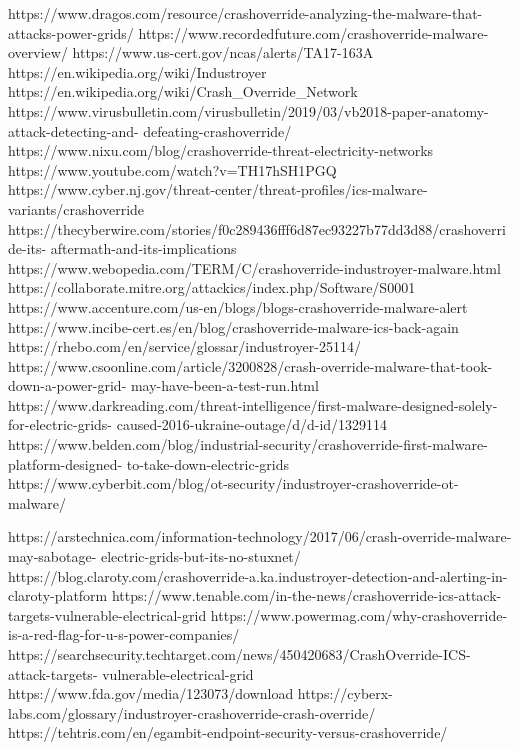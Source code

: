 https://www.dragos.com/resource/crashoverride-analyzing-the-malware-that-attacks-power-grids/
https://www.recordedfuture.com/crashoverride-malware-overview/
https://www.us-cert.gov/ncas/alerts/TA17-163A
https://en.wikipedia.org/wiki/Industroyer
https://en.wikipedia.org/wiki/Crash_Override_Network
https://www.virusbulletin.com/virusbulletin/2019/03/vb2018-paper-anatomy-attack-detecting-and-
defeating-crashoverride/
https://www.nixu.com/blog/crashoverride-threat-electricity-networks
https://www.youtube.com/watch?v=TH17hSH1PGQ
https://www.cyber.nj.gov/threat-center/threat-profiles/ics-malware-variants/crashoverride
https://thecyberwire.com/stories/f0c289436fff6d87ec93227b77dd3d88/crashoverride-its-
aftermath-and-its-implications
https://www.webopedia.com/TERM/C/crashoverride-industroyer-malware.html
https://collaborate.mitre.org/attackics/index.php/Software/S0001
https://www.accenture.com/us-en/blogs/blogs-crashoverride-malware-alert
https://www.incibe-cert.es/en/blog/crashoverride-malware-ics-back-again
https://rhebo.com/en/service/glossar/industroyer-25114/
https://www.csoonline.com/article/3200828/crash-override-malware-that-took-down-a-power-grid-
may-have-been-a-test-run.html
https://www.darkreading.com/threat-intelligence/first-malware-designed-solely-for-electric-grids-
caused-2016-ukraine-outage/d/d-id/1329114
https://www.belden.com/blog/industrial-security/crashoverride-first-malware-platform-designed-
to-take-down-electric-grids
https://www.cyberbit.com/blog/ot-security/industroyer-crashoverride-ot-malware/

https://arstechnica.com/information-technology/2017/06/crash-override-malware-may-sabotage-
electric-grids-but-its-no-stuxnet/
https://blog.claroty.com/crashoverride-a.ka.industroyer-detection-and-alerting-in-claroty-platform
https://www.tenable.com/in-the-news/crashoverride-ics-attack-targets-vulnerable-electrical-grid
https://www.powermag.com/why-crashoverride-is-a-red-flag-for-u-s-power-companies/
https://searchsecurity.techtarget.com/news/450420683/CrashOverride-ICS-attack-targets-
vulnerable-electrical-grid
https://www.fda.gov/media/123073/download
https://cyberx-labs.com/glossary/industroyer-crashoverride-crash-override/
https://tehtris.com/en/egambit-endpoint-security-versus-crashoverride/

